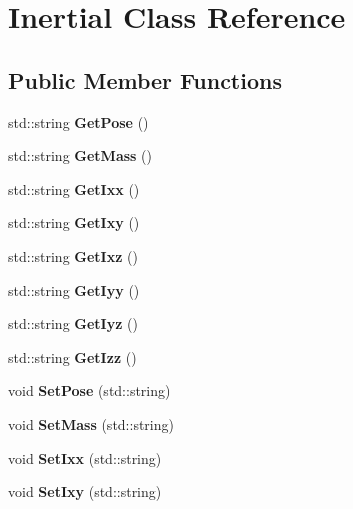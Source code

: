 \section{Inertial Class Reference}
\label{class_inertial}
\subsection*{Public Member Functions}
\begin{DoxyCompactItemize}
\item 
std\+::string {\bfseries Get\+Pose} ()\label{class_inertial_a42041b59eaf2082be6d33cf753311b4a}

\item 
std\+::string {\bfseries Get\+Mass} ()\label{class_inertial_aafc7ce312cdb765d7c71c3f577f7a200}

\item 
std\+::string {\bfseries Get\+Ixx} ()\label{class_inertial_aad7f178d59dd4a1ffbbb785094b3e987}

\item 
std\+::string {\bfseries Get\+Ixy} ()\label{class_inertial_af865eb6f6599b819a7f98eefeec84e4a}

\item 
std\+::string {\bfseries Get\+Ixz} ()\label{class_inertial_aee9b44360468804132a4bc8ac5495e4a}

\item 
std\+::string {\bfseries Get\+Iyy} ()\label{class_inertial_ab08c04e5dbfe097b271aaa55b1ab1677}

\item 
std\+::string {\bfseries Get\+Iyz} ()\label{class_inertial_a43957b42397b5386866ba1b1708d7019}

\item 
std\+::string {\bfseries Get\+Izz} ()\label{class_inertial_a9697d5b3fbdc5ff471a799263c52d1cd}

\item 
void {\bfseries Set\+Pose} (std\+::string)\label{class_inertial_a37aa33b2c45ad359933fdaebe80c0daa}

\item 
void {\bfseries Set\+Mass} (std\+::string)\label{class_inertial_a09e6bf648ff9f66a92d4845e3e679834}

\item 
void {\bfseries Set\+Ixx} (std\+::string)\label{class_inertial_a4303bb252f71c56c1293d6e1aa6f859f}

\item 
void {\bfseries Set\+Ixy} (std\+::string)\label{class_inertial_aabdad5f2417c819e00bfe2c583c1c750}


\end{DoxyCompactItemize}
